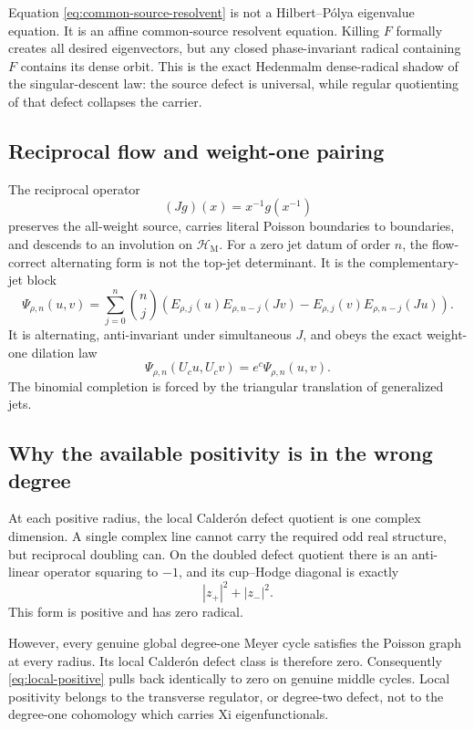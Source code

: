 \documentclass[11pt]{article}
\theoremstyle{definition}
\theoremstyle{remark}
\newcommand{\cH}{\mathcal H}
\begin{document}
Equation \eqref{eq:common-source-resolvent} is not a Hilbert--P\'olya
eigenvalue equation.  It is an affine common-source resolvent equation.
Killing \(F\) formally creates all desired eigenvectors, but any closed
phase-invariant radical containing \(F\) contains its dense orbit.  This is
the exact Hedenmalm dense-radical shadow of the singular-descent law: the
source defect is universal, while regular quotienting of that defect
collapses the carrier.

\subsection{Reciprocal flow and weight-one pairing}

The reciprocal operator
\[
                           (Jg)(x)=x^{-1}g(x^{-1})
\tag{5.5}\label{eq:paugam-j}
\]
preserves the all-weight source, carries literal Poisson boundaries to
boundaries, and descends to an involution on \(\cH_{\mathrm M}\).
For a zero jet datum of order \(n\), the flow-correct alternating form is
not the top-jet determinant.  It is the complementary-jet block
\[
\Psi_{\rho,n}(u,v)
=\sum_{j=0}^{n}\binom nj
\left(
 E_{\rho,j}(u)E_{\rho,n-j}(Jv)
-E_{\rho,j}(v)E_{\rho,n-j}(Ju)
\right).
\tag{5.6}\label{eq:paugam-pairing}
\]
It is alternating, anti-invariant under simultaneous \(J\), and obeys
the exact weight-one dilation law
\[
 \Psi_{\rho,n}(U_cu,U_cv)=e^c\Psi_{\rho,n}(u,v).
\tag{5.7}\label{eq:weight-one}
\]
The binomial completion is forced by the triangular translation of
generalized jets.

\subsection{Why the available positivity is in the wrong degree}

At each positive radius, the local Calder\'on defect quotient is one
complex dimension.  A single complex line cannot carry the required odd
real structure, but reciprocal doubling can.  On the doubled defect
quotient there is an anti-linear operator squaring to \(-1\), and its
cup--Hodge diagonal is exactly
\[
                          |z_+|^2+|z_-|^2.
\tag{5.8}\label{eq:local-positive}
\]
This form is positive and has zero radical.

However, every genuine global degree-one Meyer cycle satisfies the
Poisson graph at every radius.  Its local Calder\'on defect class is
therefore zero.  Consequently \eqref{eq:local-positive} pulls back
identically to zero on genuine middle cycles.  Local positivity belongs
to the transverse regulator, or degree-two defect, not to the
degree-one cohomology which carries Xi eigenfunctionals.
\end{document}
